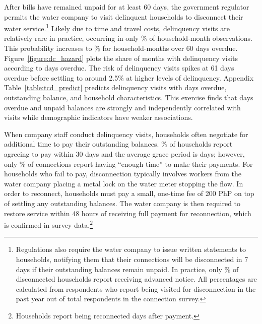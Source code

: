 \documentclass[12pt]{article}
\begin{document}
After bills have remained unpaid for at least 60 days, the government regulator permits the water company to visit delinquent households to disconnect their water service.\footnote{Regulations also require the water company to issue written statements to households, notifying them that their connections will be disconnected in 7 days if their outstanding balances remain unpaid.  In practice, only \unskip\% of disconnected households report receiving advanced notice.  All percentages are calculated from respondents who report being visited for disconnection in the past year out of total respondents in the connection survey.}  Likely due to time and travel costs, delinquency visits are relatively rare in practice, occurring in only \unskip\% of household-month observations.  This probability increases to \unskip\% for household-months over 60 days overdue.  Figure~\ref{figure:dc_hazard} plots the share of months with delinquency visits according to days overdue.  The risk of delinquency visits spikes at 61 days overdue before settling to around 2.5\% at higher levels of delinquency.  Appendix Table~\ref{table:tcd_predict} predicts delinquency visits with days overdue, outstanding balance, and household characteristics.  This exercise finds that days overdue and unpaid balances are strongly and independently correlated with visits while demographic indicators have weaker associations. %

When company staff conduct delinquency visits, households often negotiate for additional time to pay their outstanding balances.  \unskip\% of households report agreeing to pay within 30 days and the average grace period is days; however, only \unskip\% of connections report having ``enough time'' to make their payments.  For households who fail to pay, disconnection typically involves workers from the water company placing a metal lock on the water meter stopping the flow.  In order to reconnect, households must pay a small, one-time fee of 200 PhP on top of settling any outstanding balances.  The water company is then required to restore service within 48 hours of receiving full payment for reconnection, which is confirmed in survey data.\footnote{Households report being reconnected days after payment.}  
\end{document}
